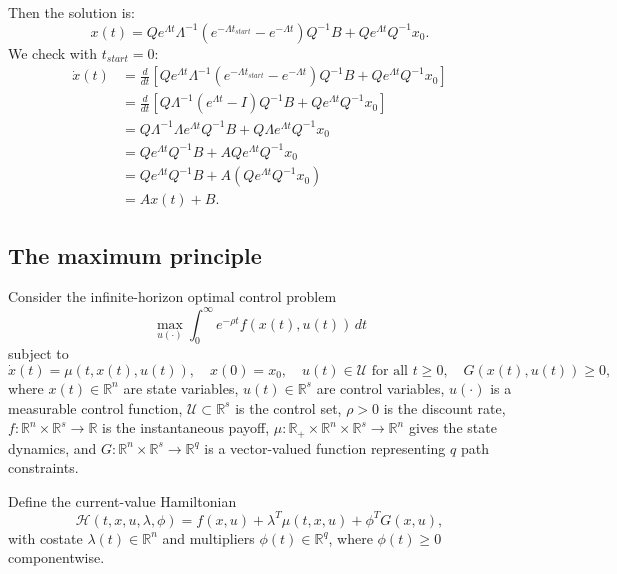 \documentclass[../../lecture_notes.tex]{subfiles}
\begin{document}
Then the solution is:
\begin{equation*}
  x(t)=Qe^{\Lambda t}\Lambda^{-1}\left( e^{-\Lambda t_{start}}-e^{-\Lambda t}\right) Q^{-1}B+Qe^{\Lambda t}Q^{-1}x_{0}.
\end{equation*}
We check with \(t_{start}=0\):
\begin{align*}
  \dot{x}(t) &=\frac{d}{dt}\left[ Qe^{\Lambda t}\Lambda^{-1}\left( e^{-\Lambda t_{start}}-e^{-\Lambda t}\right) Q^{-1}B+Qe^{\Lambda t}Q^{-1}x_{0}\right] \\
  &=\frac{d}{dt}\left[ Q\Lambda^{-1}\left( e^{\Lambda t}-I\right) Q^{-1}B+Qe^{\Lambda t}Q^{-1}x_{0}\right] \\
  &=Q\Lambda^{-1}\Lambda e^{\Lambda t}Q^{-1}B+Q\Lambda e^{\Lambda t}Q^{-1}x_{0} \\
  &=Qe^{\Lambda t}Q^{-1}B+AQe^{\Lambda t}Q^{-1}x_{0} \\
  &=Qe^{\Lambda t}Q^{-1}B+A\left( Qe^{\Lambda t}Q^{-1}x_{0}\right) \\
  &=Ax(t)+B.
\end{align*}

\subsection{The maximum principle}

Consider the infinite-horizon optimal control problem
\begin{equation*}
  \max_{u(\cdot)} \int_{0}^{\infty} e^{-\rho t} f(x(t),u(t)) \, dt
\end{equation*}
subject to
\begin{equation*}
  \dot{x}(t)=\mu(t,x(t),u(t)), \quad x(0)=x_{0}, \quad u(t)\in\mathcal{U} \text{ for all } t \ge 0, \quad G(x(t),u(t))\ge 0,
\end{equation*}
where \(x(t)\in\mathbb{R}^{n}\) are state variables, \(u(t)\in\mathbb{R}^{s}\) are control variables, \(u(\cdot)\) is a measurable control function, \(\mathcal{U}\subset\mathbb{R}^{s}\) is the control set, \(\rho>0\) is the discount rate, \(f:\mathbb{R}^{n}\times\mathbb{R}^{s}\to\mathbb{R}\) is the instantaneous payoff, \(\mu:\mathbb{R}_{+}\times\mathbb{R}^{n}\times\mathbb{R}^{s}\to\mathbb{R}^{n}\) gives the state dynamics, and \(G:\mathbb{R}^{n}\times\mathbb{R}^{s}\to\mathbb{R}^{q}\) is a vector-valued function representing \(q\) path constraints.

Define the current-value Hamiltonian
\begin{equation*}
  \mathcal{H}(t,x,u,\lambda,\phi)=f(x,u)+\lambda^{T}\mu(t,x,u)+\phi^{T}G(x,u),
\end{equation*}
with costate \(\lambda(t)\in\mathbb{R}^{n}\) and multipliers \(\phi(t)\in\mathbb{R}^{q}\), where \(\phi(t)\ge 0\) componentwise.
\end{document}

